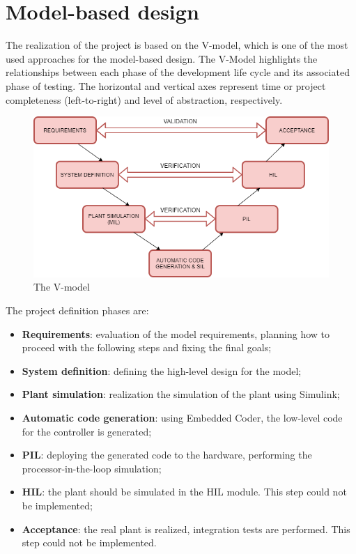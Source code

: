 \documentclass[12pt,a4paper]{report}
\begin{document}
\section{Model-based design}
The realization of the project is based on the V-model, which is one of the most used approaches for the model-based design. The V-Model highlights the relationships between each phase of the development life cycle and its associated phase of testing.  The horizontal and vertical axes represent time or project completeness (left-to-right) and level of abstraction, respectively. \\
\begin{figure}[htbp]
	\centering
	\includegraphics[scale=0.6]{v-model.png}
	\caption{The V-model}
\end{figure}
\FloatBarrier
The project definition phases are:
\begin{itemize}
	\item \textbf{Requirements}: evaluation of the model requirements, planning how to proceed with the following steps and fixing the final goals;
	\item \textbf{System definition}: defining the high-level design for the model;
	\item \textbf{Plant simulation}: realization the simulation of the plant using Simulink;
	\item \textbf{Automatic code generation}: using Embedded Coder, the low-level code for the controller is generated;
	\item \textbf{PIL}: deploying the generated code to the hardware, performing the processor-in-the-loop simulation;
	\item \textbf{HIL}: the plant should be simulated in the HIL module. This step could not be implemented;
	\item \textbf{Acceptance}: the real plant is realized, integration tests are performed. This step could not be implemented.
\end{itemize}
\FloatBarrier
\end{document}

